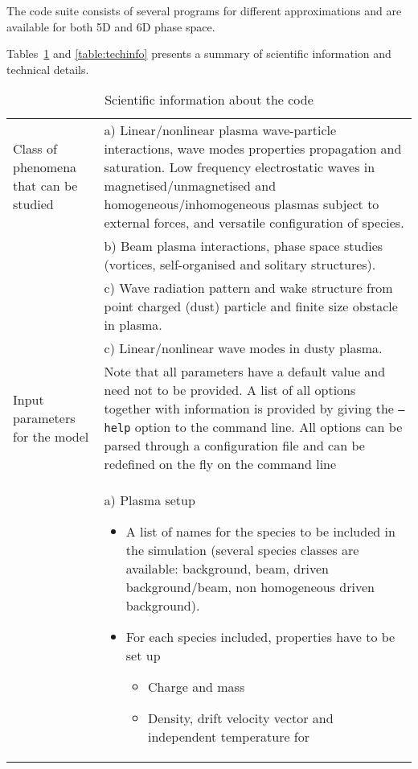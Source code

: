 \documentclass[10pt,a4paper]{article}
\newlength{\firstcol}
\newlength{\secondcol}
\begin{document}
The code suite consists of several programs for different approximations and
are available for both 5D and 6D phase space.

Tables~\ref{table:scieinfo} and \ref{table:techinfo} presents a summary of
scientific information and technical details.

\begin{table}[ht]
\caption{Scientific information about the code}
\label{table:scieinfo}
\vspace{2mm}
\begin{footnotesize}
\begin{tabularx}{\textwidth}{|X|X|}
\hline
Class of phenomena that can be studied  &
a) Linear/nonlinear plasma wave-particle interactions, wave modes properties
propagation and saturation.
Low frequency electrostatic waves in magnetised/unmagnetised
and homogeneous/inhomogeneous plasmas subject to external forces,
and versatile configuration of species.\\
& b) Beam plasma interactions, phase space studies (vortices,
self-organised and solitary structures).\\
& c) Wave radiation pattern and wake structure from point charged (dust)
particle and finite size obstacle in plasma.\\
& c) Linear/nonlinear wave modes in dusty plasma.\\
\hline
Input parameters for the model          &
Note that all parameters have a default value and need not to be provided.
A list of all options together with information is provided by giving the
\texttt{--help} option to the command line. All options can be parsed
through a configuration file and can be redefined on the fly on the command
line\\
&
a) Plasma setup
\begin{itemize}
\item A list of names for the species to be included in the simulation
(several
species classes are available: background, beam, driven background/beam,
non homogeneous driven background).
\item For each species included, properties have to be set up
\begin{itemize}
\item Charge and mass
\item Density, drift velocity vector and independent temperature for

\end{itemize}
\end{itemize}
\end{tabularx}
\end{footnotesize}
\end{table}
\end{document}
